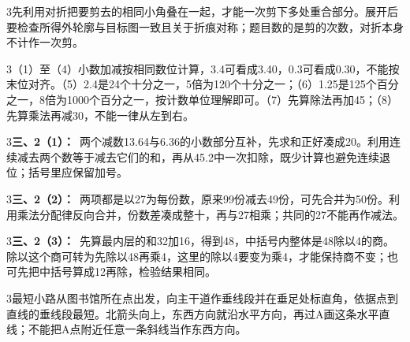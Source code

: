 \documentclass[multi=snippet,border={5bp 20bp 5bp 5bp}]{standalone}
\newenvironment{snippet}[3]{\begin{minipage}{#1bp}\color{answerred}\fontsize{#2}{#3}\selectfont\raggedright}{\end{minipage}}
\begin{document}
\begin{snippet}{505}{11.5}{14}\begin{multicols}{3}\raggedcolumns 先利用对折把要剪去的相同小角叠在一起，才能一次剪下多处重合部分。展开后要检查所得外轮廓与目标图一致且关于折痕对称；题目数的是剪的次数，对折本身不计作一次剪。\end{multicols}\end{snippet}
\begin{snippet}{505}{11.5}{14}\begin{multicols}{3}\raggedcolumns （1）至（4）小数加减按相同数位计算，3.4可看成3.40，0.3可看成0.30，不能按末位对齐。（5）2.4是24个十分之一，5倍为120个十分之一；（6）1.25是125个百分之一，8倍为1000个百分之一，按计数单位理解即可。（7）先算除法再加45；（8）先算乘法再减30，不能一律从左到右。\end{multicols}\end{snippet}
\begin{snippet}{505}{11.5}{14}\begin{multicols}{3}\raggedcolumns \textbf{三、2（1）：}\ 两个减数13.64与6.36的小数部分互补，先求和正好凑成20。利用连续减去两个数等于减去它们的和，再从45.2中一次扣除，既少计算也避免连续退位；括号里应保留加号。\end{multicols}\end{snippet}
\begin{snippet}{505}{11.5}{14}\begin{multicols}{3}\raggedcolumns \textbf{三、2（2）：}\ 两项都是以27为每份数，原来99份减去49份，可先合并为50份。利用乘法分配律反向合并，份数差凑成整十，再与27相乘；共同的27不能再作减法。\end{multicols}\end{snippet}
\begin{snippet}{505}{11.5}{14}\begin{multicols}{3}\raggedcolumns \textbf{三、2（3）：}\ 先算最内层的和32加16，得到48，中括号内整体是48除以4的商。除以这个商可转为先除以48再乘4，这里的除以4要变为乘4，才能保持商不变；也可先把中括号算成12再除，检验结果相同。\end{multicols}\end{snippet}
\begin{snippet}{505}{11.5}{14}\begin{multicols}{3}\raggedcolumns 最短小路从图书馆所在点出发，向主干道作垂线段并在垂足处标直角，依据点到直线的垂线段最短。北箭头向上，东西方向就沿水平方向，再过A画这条水平直线；不能把A点附近任意一条斜线当作东西方向。\end{multicols}\end{snippet}
\end{document}
